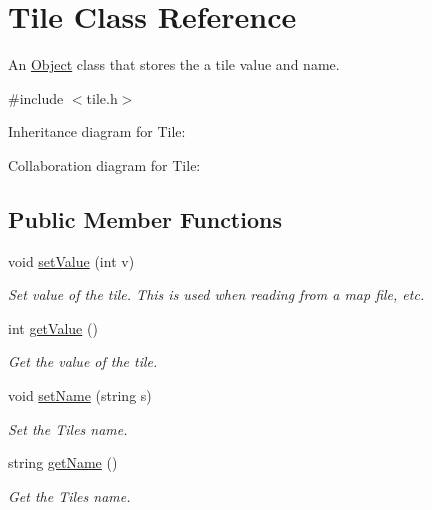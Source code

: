 \hypertarget{classTile}{}\section{Tile Class Reference}
\label{classTile}


An \hyperlink{classObject}{Object} class that stores the a tile value and name.  




{\ttfamily \#include $<$tile.\+h$>$}



Inheritance diagram for Tile\+:


Collaboration diagram for Tile\+:
\subsection*{Public Member Functions}
\begin{DoxyCompactItemize}
\item 
void \hyperlink{classTile_ae3d9e4ace265389dd0e0cf3d62ad6ff3}{set\+Value} (int v)\hypertarget{classTile_ae3d9e4ace265389dd0e0cf3d62ad6ff3}{}\label{classTile_ae3d9e4ace265389dd0e0cf3d62ad6ff3}

\begin{DoxyCompactList}\small\item\em Set value of the tile. This is used when reading from a map file, etc. \end{DoxyCompactList}\item 
int \hyperlink{classTile_aaab3d77d23e378c207ec50e6786052e0}{get\+Value} ()\hypertarget{classTile_aaab3d77d23e378c207ec50e6786052e0}{}\label{classTile_aaab3d77d23e378c207ec50e6786052e0}

\begin{DoxyCompactList}\small\item\em Get the value of the tile. \end{DoxyCompactList}\item 
void \hyperlink{classTile_a03e1a9f0351fcd4d1616bb59f7bd89f3}{set\+Name} (string s)\hypertarget{classTile_a03e1a9f0351fcd4d1616bb59f7bd89f3}{}\label{classTile_a03e1a9f0351fcd4d1616bb59f7bd89f3}

\begin{DoxyCompactList}\small\item\em Set the Tiles name. \end{DoxyCompactList}\item 
string \hyperlink{classTile_a233978090bf0ecbec9aa4d00bb0ac13d}{get\+Name} ()\hypertarget{classTile_a233978090bf0ecbec9aa4d00bb0ac13d}{}\label{classTile_a233978090bf0ecbec9aa4d00bb0ac13d}

\begin{DoxyCompactList}\small\item\em Get the Tiles name. \end{DoxyCompactList}\end{DoxyCompactItemize}
